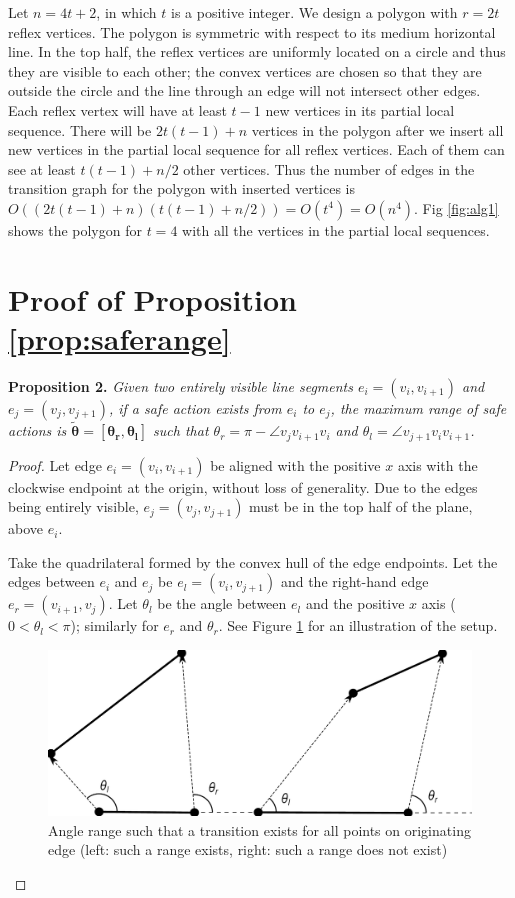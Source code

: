 \documentclass[]{styles/svproc}  %
\begin{document}
\begin{appendix}
Let $n = 4t+2$, in which $t$ is a positive integer. We design a polygon with
$r = 2t$ reflex vertices. The polygon is symmetric with respect to its medium
horizontal line. In the top half, the reflex vertices are uniformly located on a
circle and thus they are visible to each other; the convex vertices are chosen
so that they are outside the circle and the line through an edge will not
intersect other edges. Each reflex vertex will have at least $t-1$ new
vertices in its partial local sequence. There will be $2t(t-1)+n$
vertices in the polygon after we insert all new vertices in the partial local
sequence for all reflex vertices. Each of them can see at least $t(t-1)+n/2$
other vertices. Thus the number of edges in the transition graph for the
polygon with inserted vertices is
$O ((2t(t-1)+n)(t(t-1)+n/2)) = O(t^4) = O(n^4)$.
Fig \ref{fig:alg1} shows the polygon for $t = 4$ with all the
vertices in the partial local sequences. %

\section{Proof of Proposition \ref{prop:saferange}}

\textbf{Proposition 2.} {\em
Given two entirely visible line segments $e_i = (v_i, v_{i+1})$ and $e_j =
(v_j, v_{j+1})$, if a safe action
exists from $e_i$ to $e_j$, the maximum range of safe actions is $\bm{\tilde{\theta} = [\theta_r, \theta_l]}$ such
that $\theta_r = \pi - \angle v_j v_{i+1} v_i$ and $\theta_l = \angle v_{j+1}
v_i v_{i+1}$.}

\begin{proof}

Let edge $e_i = (v_i, v_{i+1})$ be aligned with the positive $x$ axis with the clockwise
endpoint at the origin, without loss of generality. 
Due to the edges being
entirely visible, $e_j = (v_j, v_{j+1})$ must be in the top half of the plane, above
$e_i$.

Take the quadrilateral formed by the convex hull of the edge endpoints.
Let the edges between $e_i$ and $e_j$ be $e_l = (v_i, v_{j+1})$ and the right-hand edge 
$e_r = (v_{i+1}, v_j)$. Let $\theta_{l}$ be
the angle between $e_l$ and the positive $x$ axis ($0 < \theta_l < \pi$); similarly
for $e_r$ and $\theta_r$. See Figure \ref{fig:bounce_range} for an illustration of
the setup. 

\begin{figure}
    \centering
    \includegraphics[width=0.7\linewidth]{figures/bouncerange_min.pdf}
    \caption{Angle range such that a transition exists for all points on
originating edge (left: such a range exists, right: such a range does not
exist)}
\label{fig:bounce_range}
\end{figure}



\end{proof}
\end{appendix}
\end{document}
